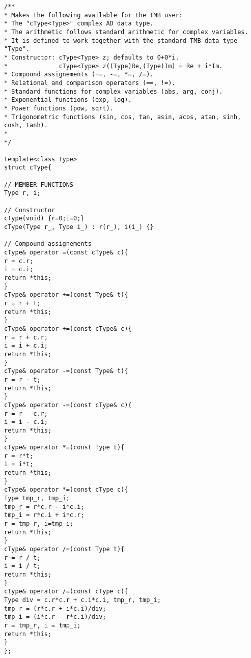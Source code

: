 \begin{frame}
	
	

	
	\begin{lstlisting}[caption={Creation of the complex cType data type in TMB},label={lst:complex}]
/**
* Makes the following available for the TMB user:
* The "cType<Type>" complex AD data type. 
* The arithmetic follows standard arithmetic for complex variables.
* It is defined to work together with the standard TMB data type "Type".
* Constructor: cType<Type> z; defaults to 0+0*i.
*              cType<Type> z((Type)Re,(Type)Im) = Re + i*Im.
* Compound assignements (+=, -=, *=, /=).
* Relational and comparison operators (==, !=).
* Standard functions for complex variables (abs, arg, conj).
* Exponential functions (exp, log).
* Power functions (pow, sqrt).
* Trigonometric functions (sin, cos, tan, asin, acos, atan, sinh, cosh, tanh).
* 
*/

template<class Type>
struct cType{

// MEMBER FUNCTIONS
Type r, i;

// Constructor
cType(void) {r=0;i=0;}
cType(Type r_, Type i_) : r(r_), i(i_) {}

// Compound assignements
cType& operator =(const cType& c){
r = c.r;
i = c.i;
return *this;
}
cType& operator +=(const Type& t){
r = r + t;
return *this;
}
cType& operator +=(const cType& c){
r = r + c.r;
i = i + c.i;
return *this;
}
cType& operator -=(const Type& t){
r = r - t;
return *this;
}
cType& operator -=(const cType& c){
r = r - c.r;
i = i - c.i;
return *this;
}
cType& operator *=(const Type t){
r = r*t;
i = i*t;
return *this;
}
cType& operator *=(const cType c){
Type tmp_r, tmp_i;
tmp_r = r*c.r - i*c.i;
tmp_i = r*c.i + i*c.r;
r = tmp_r, i=tmp_i;
return *this;
}
cType& operator /=(const Type t){
r = r / t;
i = i / t;
return *this;
}
cType& operator /=(const cType c){
Type div = c.r*c.r + c.i*c.i, tmp_r, tmp_i;
tmp_r = (r*c.r + i*c.i)/div;
tmp_i = (i*c.r - r*c.i)/div;
r = tmp_r, i = tmp_i;
return *this;
}
};


\end{lstlisting}
\end{frame}
